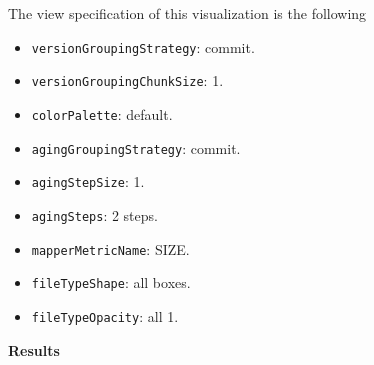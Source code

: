 The view specification of this visualization is the following
\begin{itemize}
    \item \texttt{versionGroupingStrategy}: commit.
    \item \texttt{versionGroupingChunkSize}: 1. 
    \item \texttt{colorPalette}: default.
    \item \texttt{agingGroupingStrategy}: commit.
    \item \texttt{agingStepSize}: 1.
    \item \texttt{agingSteps}: 2 steps. 
    \item \texttt{mapperMetricName}: SIZE. 
    \item \texttt{fileTypeShape}: all boxes.
    \item \texttt{fileTypeOpacity}: all 1. 
\end{itemize}

\textbf{Results}


